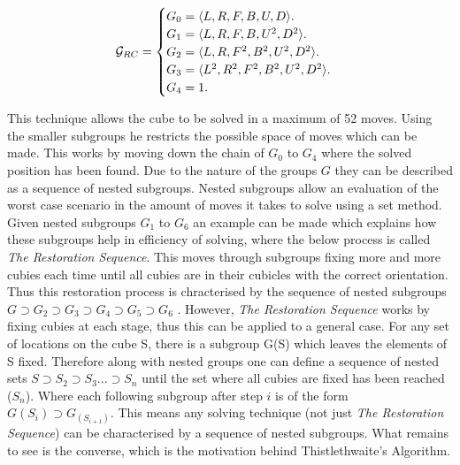 \documentclass{article}
\DeclarePairedDelimiter{\opair}{\langle}{\rangle}
\newcounter{lem}[section]\setcounter{lem}{0}
\begin{document}
\begin{equation}
  \mathcal{G}_{RC}=\begin{cases}
    G_{0} = \text{$\opair{L,R,F,B,U,D}$}.\\
    G_{1} = \text{$\opair{L,R,F,B,U^{2},D^{2}}$}.\\
    G_{2} = \text{$\opair{L,R,F^{2},B^{2},U^{2},D^{2}}$}.\\
    G_{3} = \text{$\opair{L^{2},R^{2},F^{2},B^{2},U^{2},D^{2}}$}.\\
    G_{4} = \text{1}.
  \end{cases}
\end{equation}

This technique allows the cube to be solved in a maximum of 52 moves. Using the smaller subgroups he restricts the possible space of moves which can be made. This works by moving down the chain of $G_{0}$ to $G_{4}$ where the solved position has been found. Due to the nature of the groups $G$ they can be described as a sequence of nested subgroups. Nested subgroups allow an evaluation of the worst case scenario in the amount of moves it takes to solve using a set method. Given nested subgroups $G_1$ to $G_6$ an example can be made which explains how these subgroups help in efficiency of solving, where the below process is called \textit{The Restoration Sequence}. This moves through subgroups fixing more and more cubies each time until all cubies are in their cubicles with the correct orientation. Thus this restoration process is chracterised by the sequence of nested subgroups $G \supset G_2 \supset G_3 \supset G_4 \supset G_5 \supset G_6 $ \cite{alexander1982handbook}.
However, \textit{The Restoration Sequence} works by fixing cubies at each stage, thus this can be applied to a general case. For any set of locations on the cube S, there is a subgroup G(S) which leaves the elements of S fixed. Therefore along with nested groups one can define a sequence of nested sets $S \supset S_2 \supset S_3 ... \supset S_n $ until the set where all cubies are fixed has been reached ($S_n$). Where each following subgroup after step $i$ is of the form $G(S_i) \supset G_(S_{i+1})$. This means any solving technique (not just \textit{The Restoration Sequence}) can be characterised by a sequence of nested subgroups. What remains to see is the converse, which is the motivation behind Thistlethwaite's Algorithm.
\end{document}

